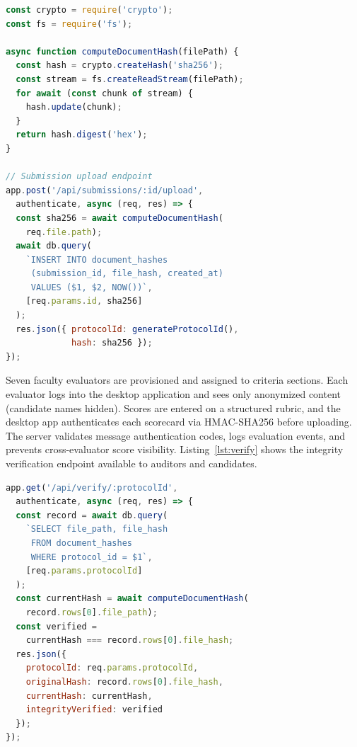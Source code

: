 \documentclass[preprint,12pt,a4paper]{elsarticle}
\begin{document}
\begin{lstlisting}[language=JavaScript, caption={Server-side SHA-256 hash computation upon document upload. The hash is stored in the database and returned to the candidate as a verification receipt.}, label=lst:hashcompute]
const crypto = require('crypto');
const fs = require('fs');

async function computeDocumentHash(filePath) {
  const hash = crypto.createHash('sha256');
  const stream = fs.createReadStream(filePath);
  for await (const chunk of stream) {
    hash.update(chunk);
  }
  return hash.digest('hex');
}

// Submission upload endpoint
app.post('/api/submissions/:id/upload',
  authenticate, async (req, res) => {
  const sha256 = await computeDocumentHash(
    req.file.path);
  await db.query(
    `INSERT INTO document_hashes
     (submission_id, file_hash, created_at)
     VALUES ($1, $2, NOW())`,
    [req.params.id, sha256]
  );
  res.json({ protocolId: generateProtocolId(),
             hash: sha256 });
});
\end{lstlisting}

Seven faculty evaluators are provisioned and assigned to criteria sections. Each evaluator logs into the desktop application and sees only anonymized content (candidate names hidden). Scores are entered on a structured rubric, and the desktop app authenticates each scorecard via HMAC-SHA256 before uploading. The server validates message authentication codes, logs evaluation events, and prevents cross-evaluator score visibility. Listing~\ref{lst:verify} shows the integrity verification endpoint available to auditors and candidates.

\begin{lstlisting}[language=JavaScript, caption={Document integrity verification endpoint. Compares the stored hash against a freshly computed hash to detect post-submission modification.}, label=lst:verify]
app.get('/api/verify/:protocolId',
  authenticate, async (req, res) => {
  const record = await db.query(
    `SELECT file_path, file_hash
     FROM document_hashes
     WHERE protocol_id = $1`,
    [req.params.protocolId]
  );
  const currentHash = await computeDocumentHash(
    record.rows[0].file_path);
  const verified =
    currentHash === record.rows[0].file_hash;
  res.json({
    protocolId: req.params.protocolId,
    originalHash: record.rows[0].file_hash,
    currentHash: currentHash,
    integrityVerified: verified
  });
});
\end{lstlisting}
\end{document}
